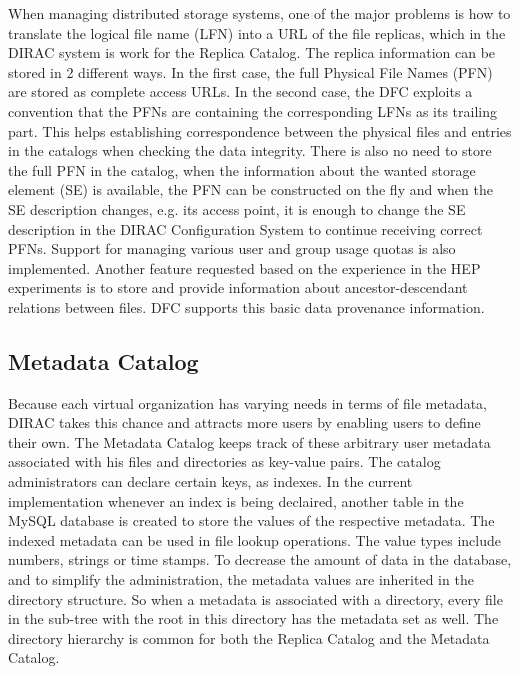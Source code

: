 When managing distributed storage systems, one of the major problems is how to translate the logical 
file name (LFN) into a URL of the file replicas, which in the DIRAC system is work for the Replica
Catalog. The replica information can be stored in 2 different ways. In the first case, the full Physical File
Names (PFN) are stored as complete access URLs. In the second case, the DFC exploits a convention
that the PFNs are containing the corresponding LFNs as its trailing part. %
This helps establishing correspondence between the physical files and entries in the catalogs when checking 
the data integrity. There is also no need to store the full PFN in the catalog, when
the information about the wanted storage element (SE) is available, the PFN can be constructed on the fly and when 
the SE description changes, e.g. its access point, it is enough to change the SE description in the DIRAC 
Configuration System to continue receiving correct PFNs. Support for managing various user and group usage 
quotas is also implemented. Another feature requested based on the experience in 
the HEP experiments is to store and provide information about ancestor-descendant relations between files. 
DFC supports this basic data provenance information. 

\subsection{Metadata Catalog}

Because each virtual organization has varying needs in terms of file metadata, DIRAC takes this chance and 
attracts more users by enabling users to define their own. The Metadata Catalog keeps track of these 
arbitrary user metadata associated with his files and directories as key-value pairs. 
The catalog administrators can declare certain keys, as indexes. In the current implementation whenever an 
index is being declaired, another table in the MySQL database is created to store the values of the 
respective metadata. The indexed metadata can be used in file lookup operations. The value types include 
numbers, strings or time stamps. To decrease the amount of data in the database, and to simplify the 
administration, the metadata values are inherited in the directory structure. So when a metadata is 
associated with a directory, every file in the sub-tree with the root in this directory has the metadata
set as well. The directory hierarchy is common for both the Replica Catalog and the Metadata Catalog.

